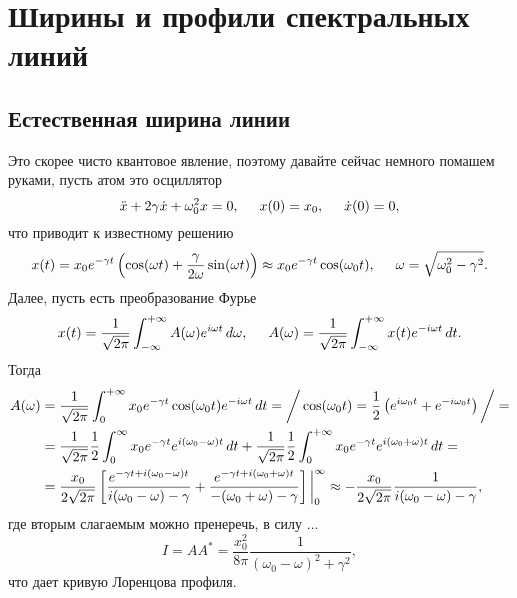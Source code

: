 \section{Ширины и профили спектральных линий}


\subsection{Естественная ширина линии}

Это скорее чисто квантовое явление, поэтому давайте сейчас немного помашем руками, пусть атом это осциллятор
\begin{equation*}
    \ddot{x} + 2 \gamma \dot{x}  +\omega_0^2 x = 0,
    \hspace{5 mm}
    x(0) = x_0,
    \hspace{5 mm}
    \dot{x}(0) = 0,
\end{equation*}
что приводит к известному решению
\begin{equation*}
    x(t) = x_0 e^{- \gamma t} \left(
        \cos (\omega t) + \frac{\gamma}{2\omega} \sin (\omega t)
    \right) \approx 
    x_0 e^{-\gamma t} \cos (\omega_0 t)
    ,
    \hspace{5 mm}
    \omega = \sqrt{\omega_0^2 - \gamma^2}.
\end{equation*}
Далее, пусть есть преобразование Фурье
\begin{equation*}
    x(t) = \frac{1}{\sqrt{2\pi}} \int_{-\infty}^{+\infty} A(\omega) e^{i \omega t} \, d \omega,
    \hspace{5 mm}
    A(\omega) = \frac{1}{\sqrt{2\pi}} \int_{-\infty}^{+\infty} x(t) e^{-i \omega t} \, d t.
\end{equation*}
Тогда
\begin{align*}
    A(\omega) &= \frac{1}{\sqrt{2\pi}} \int_{0}^{+\infty} x_0 e^{- \gamma t} \cos (\omega_0 t)
    e^{- i \omega t} \, d t = \bigg/
        \cos (\omega_0 t) = \frac{1}{2} \left( e^{i \omega_0 t} + e^{- i \omega_0 t}\right)
    \bigg/ = \\
    &=  \frac{1}{\sqrt{2\pi}} \frac{1}{2} \int_{0}^{\infty} x_0 e^{-\gamma t} e^{i (\omega_0 - \omega)t} \, d t + 
    \frac{1}{\sqrt{2\pi}} \frac{1}{2} \int_{0}^{+\infty} x_0 e^{-\gamma t} e^{i(\omega_0+\omega)t} \, d t = \\
    &= \frac{x_0}{2 \sqrt{2\pi}}  \left[
        \frac{e^{-\gamma t + i(\omega_0 - \omega) t}}{i (\omega_0 - \omega) - \gamma} + 
        \frac{e^{-\gamma t + i (\omega_0 + \omega)t}}{- (\omega_0 + \omega) - \gamma}
    \right] \bigg|_0^\infty \approx
    - \frac{x_0}{2 \sqrt{2\pi}} \frac{1}{i (\omega_0 - \omega) - \gamma}
    ,
\end{align*}
где вторым слагаемым можно пренеречь, в силу ...
\begin{equation*}
    I = A A^* = \frac{x_0^2}{8 \pi} \frac{1}{(\omega_0-\omega)^2 + \gamma^2},
\end{equation*}
что дает кривую Лоренцова профиля.

